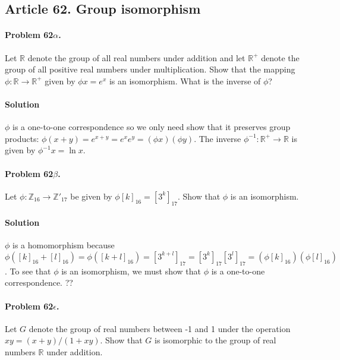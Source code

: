 \subsection{Article 62. Group isomorphism}

\paragraph{Problem 62$\alpha$.}
Let $\mathbb{R}$ denote the group of all real numbers under addition and let
$\mathbb{R}^+$ denote the group of all positive real numbers under multiplication.
Show that the mapping $\phi : \mathbb{R} \rightarrow \mathbb{R}^+$ given by
$\phi x = e^x$ is an isomorphism. What is the inverse of $\phi$?

\paragraph*{Solution}
$\phi$ is a one-to-one correspondence so we only need show that it preserves group products:
$\phi(x+y) = e^{x+y} = e^x e^y = (\phi x)(\phi y)$. The inverse $\phi^{-1}: \mathbb{R}^+
\rightarrow \mathbb{R}$ is given by $\phi^{-1} x = \ln x$.

\paragraph{Problem 62$\beta$.}
Let $\phi : \mathbb{Z}_{16} \rightarrow \mathbb{Z'}_{17}$ be given by
$\phi [k]_{16} = [3^k]_{17}$. Show that $\phi$ is an isomorphism.

\paragraph*{Solution}
$\phi$ is a homomorphism because $\phi([k]_{16} + [l]_{16}) = \phi([k+l]_{16}) = [3^{k+l}]_{17}
= [3^k]_{17}[3^l]_{17} = (\phi [k]_{16})(\phi[l]_{16})$. To see that $\phi$ is an isomorphism,
we must show that $\phi$ is a one-to-one correspondence. ??

\paragraph{Problem 62$\epsilon$.}
Let $G$ denote the group of real numbers between -1 and 1 under the operation
$x y = (x+y)/(1+xy)$. Show that $G$ is isomorphic to the group of real numbers
$\mathbb{R}$ under addition.

